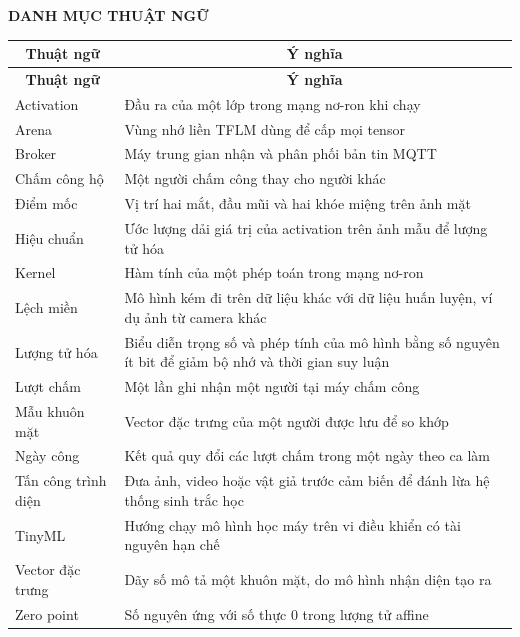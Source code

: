\documentclass[../DoAn.tex]{subfiles}
\begin{document}
\begin{center}
    \Large{\textbf{DANH MỤC THUẬT NGỮ}}\\
\end{center}
\vspace{0.5cm}

\begin{longtable}{|p{3.8cm}|p{10cm}|}
\hline
\multicolumn{1}{|c|}{\textbf{Thuật ngữ}} & \multicolumn{1}{c|}{\textbf{Ý nghĩa}} \\
\hline
\endfirsthead
\hline
\multicolumn{1}{|c|}{\textbf{Thuật ngữ}} & \multicolumn{1}{c|}{\textbf{Ý nghĩa}} \\
\hline
\endhead
\endfoot
\endlastfoot
Activation & Đầu ra của một lớp trong mạng nơ-ron khi chạy \\
\hline
Arena & Vùng nhớ liền TFLM dùng để cấp mọi tensor \\
\hline
Broker & Máy trung gian nhận và phân phối bản tin MQTT \\
\hline
Chấm công hộ & Một người chấm công thay cho người khác \\
\hline
Điểm mốc & Vị trí hai mắt, đầu mũi và hai khóe miệng trên ảnh mặt \\
\hline
Hiệu chuẩn & Ước lượng dải giá trị của activation trên ảnh mẫu để lượng tử hóa \\
\hline
Kernel & Hàm tính của một phép toán trong mạng nơ-ron \\
\hline
Lệch miền & Mô hình kém đi trên dữ liệu khác với dữ liệu huấn luyện, ví dụ ảnh từ camera khác \\
\hline
Lượng tử hóa & Biểu diễn trọng số và phép tính của mô hình bằng số nguyên ít bit để giảm bộ nhớ và thời gian suy luận \\
\hline
Lượt chấm & Một lần ghi nhận một người tại máy chấm công \\
\hline
Mẫu khuôn mặt & Vector đặc trưng của một người được lưu để so khớp \\
\hline
Ngày công & Kết quả quy đổi các lượt chấm trong một ngày theo ca làm \\
\hline
Tấn công trình diện & Đưa ảnh, video hoặc vật giả trước cảm biến để đánh lừa hệ thống sinh trắc học \\
\hline
TinyML & Hướng chạy mô hình học máy trên vi điều khiển có tài nguyên hạn chế \\
\hline
Vector đặc trưng & Dãy số mô tả một khuôn mặt, do mô hình nhận diện tạo ra \\
\hline
Zero point & Số nguyên ứng với số thực 0 trong lượng tử affine \\
\hline
\end{longtable}
\end{document}
